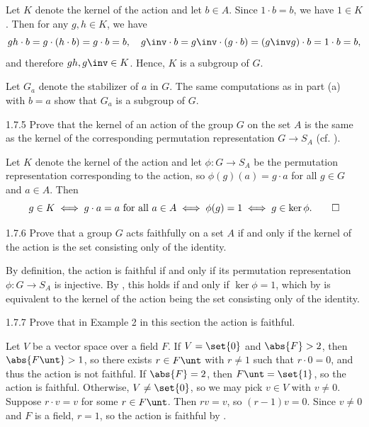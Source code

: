 \begin{solenum}
    \item Let $K$ denote the kernel of the action and let $b \in A$.
    Since $1 \cdot b = b$, we have $1 \in K$.
    Then for any $g, h \in K$, we have
    \[
        gh \cdot b = g \cdot (h \cdot b) = g \cdot b = b, \quad g\inv \cdot b = g\inv \cdot (g \cdot b) = (g\inv g) \cdot b = 1 \cdot b = b,
    \]
    and therefore $gh, g\inv \in K$.
    Hence, $K$ is a subgroup of $G$.
    \item Let $G_a$ denote the stabilizer of $a$ in $G$.
	The same computations as in part (a) with $b = a$ show that $G_a$ is a subgroup of $G$.
\end{solenum}

\begin{exercise}{1.7.5}
    Prove that the kernel of an action of the group $G$ on the set $A$ is the same as the kernel of the corresponding permutation representation $G\to S_A$ (cf. ).
\end{exercise}

\begin{sol}
    Let $K$ denote the kernel of the action and let $\phi \colon G \to S_A$ be the permutation representation corresponding to the action, so $\phi(g)(a) = g \cdot a$ for all $g \in G$ and $a \in A$.
    Then
    \[
        g \in K \iff g \cdot a = a \text{ for all } a \in A \iff \phi(g) = 1 \iff g \in \ker \phi. \qedhere
    \]
\end{sol}

\begin{exercise}{1.7.6}
    Prove that a group $G$ acts faithfully on a set $A$ if and only if the kernel of the action is the set consisting only of the identity.
\end{exercise}

\begin{sol}
    By definition, the action is faithful if and only if its permutation representation $\phi \colon G \to S_A$ is injective.
    By , this holds if and only if $\ker \phi = 1$, which by  is equivalent to the kernel of the action being the set consisting only of the identity.
\end{sol}

\begin{exercise}{1.7.7}
    Prove that in Example 2 in this section the action is faithful.
\end{exercise}

\begin{sol}
    Let $V$ be a vector space over a field $F$.
    If $V = \set{0}$ and $\abs{F} > 2$, then $\abs{F\unt} > 1$, so there exists $r \in F\unt$ with $r \neq 1$ such that $r \cdot 0 = 0$, and thus the action is not faithful.
    If $\abs{F} = 2$, then $F\unt = \set{1}$, so the action is faithful.
    Otherwise, $V \neq \set{0}$, so we may pick $v \in V$ with $v \neq 0$.
    Suppose $r \cdot v = v$ for some $r \in F\unt$.
    Then $rv = v$, so $(r - 1)v = 0$.
    Since $v \neq 0$ and $F$ is a field, $r = 1$, so the action is faithful by .
\end{sol}

